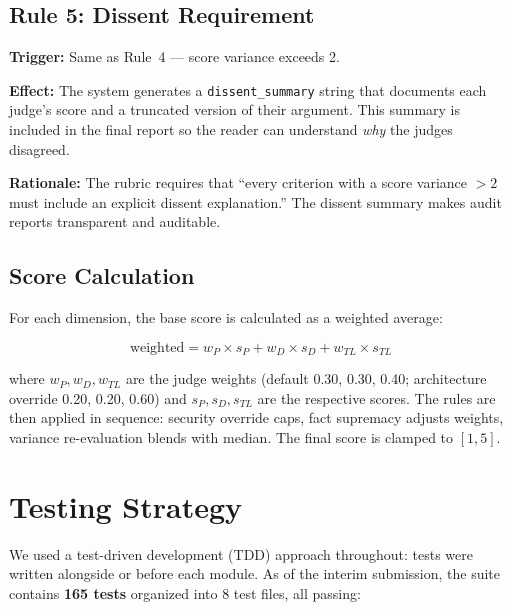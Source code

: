\documentclass[12pt,a4paper]{article}
\begin{document}
\subsection{Rule 5: Dissent Requirement}

\textbf{Trigger:} Same as Rule~4 --- score variance exceeds 2.

\textbf{Effect:} The system generates a \texttt{dissent\_summary} string that documents each judge's score and a truncated version of their argument. This summary is included in the final report so the reader can understand \emph{why} the judges disagreed.

\textbf{Rationale:} The rubric requires that ``every criterion with a score variance $> 2$ must include an explicit dissent explanation.'' The dissent summary makes audit reports transparent and auditable.

\subsection{Score Calculation}

For each dimension, the base score is calculated as a weighted average:

$$
\text{weighted} = w_P \times s_P + w_D \times s_D + w_{TL} \times s_{TL}
$$

where $w_P, w_D, w_{TL}$ are the judge weights (default 0.30, 0.30, 0.40; architecture override 0.20, 0.20, 0.60) and $s_P, s_D, s_{TL}$ are the respective scores. The rules are then applied in sequence: security override caps, fact supremacy adjusts weights, variance re-evaluation blends with median. The final score is clamped to $[1, 5]$.


\section{Testing Strategy}

We used a test-driven development (TDD) approach throughout: tests were written alongside or before each module. As of the interim submission, the suite contains \textbf{165 tests} organized into 8 test files, all passing:
\end{document}
